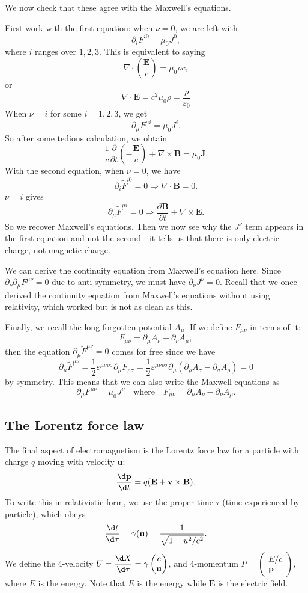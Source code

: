 \documentclass[a4paper]{article}
\begin{document}
We now check that these agree with the Maxwell's equations.

First work with the first equation: when $\nu = 0$, we are left with
\[
  \partial_i F^{i0} = \mu_0 J^0,
\]
where $i$ ranges over $1, 2, 3$. This is equivalent to saying
\[
  \nabla\cdot \left(\frac{\mathbf{E}}{c}\right) = \mu_0 \rho c,
\]
or
\[
  \nabla\cdot \mathbf{E} = c^2 \mu_0 \rho = \frac{\rho}{\varepsilon_0}
\]
When $\nu = i$ for some $i = 1, 2, 3$, we get
\[
  \partial _\mu F^{\mu i} = \mu_0 J^i.
\]
So after some tedious calculation, we obtain
\[
  \frac{1}{c}\frac{\partial}{\partial t}\left(-\frac{\mathbf{E}}{c}\right) + \nabla\times \mathbf{B} = \mu_0 \mathbf{J}.
\]
With the second equation, when $\nu = 0$, we have
\[
  \partial_i \tilde{F}^{i0} = 0 \Rightarrow  \nabla\cdot \mathbf{B} = 0.
\]
$\nu = i$ gives
\[
  \partial_\mu \tilde{F}^{\mu i} = 0 \Rightarrow  \frac{\partial \mathbf{B}}{\partial t} + \nabla\times \mathbf{E}.
\]
So we recover Maxwell's equations. Then we now see why the $J^\nu$ term appears in the first equation and not the second - it tells us that there is only electric charge, not magnetic charge.

We can derive the continuity equation from Maxwell's equation here. Since $\partial_\nu\partial_\mu F^{\mu\nu} = 0$ due to anti-symmetry, we must have $\partial_\nu J^\nu = 0$. Recall that we once derived the continuity equation from Maxwell's equations without using relativity, which worked but is not as clean as this.

Finally, we recall the long-forgotten potential $A_\mu$. If we define $F_{\mu\nu}$ in terms of it:
\[
  F_{\mu\nu} = \partial_\mu A_\nu - \partial_\nu A_\mu,
\]
then the equation $\partial_\mu \tilde{F}^{\mu\nu} = 0$ comes for free since we have
\[
  \partial_\mu \tilde{F}^{\mu\nu} = \frac{1}{2}\varepsilon^{\mu\nu\rho\sigma}\partial_{\mu}F_{\rho\sigma} = \frac{1}{2} \varepsilon^{\mu\nu\rho\sigma}\partial_\mu(\partial_\rho A_\sigma - \partial_\sigma A_\rho) = 0
\]
by symmetry. This means that we can also write the Maxwell equations as
\[
  \partial_\mu F^{\mu\nu} = \mu_0 J^\nu\quad\text{where}\quad F_{\mu\nu} = \partial_\mu A_\nu - \partial_\nu A_\mu.
\]
\subsection{The Lorentz force law}
The final aspect of electromagnetism is the Lorentz force law for a particle with charge $q$ moving with velocity $\mathbf{u}$:
\[
  \frac{\d \mathbf{p}}{\d t} = q(\mathbf{E} + \mathbf{v}\times \mathbf{B}).
\]
To write this in relativistic form, we use the proper time $\tau$ (time experienced by particle), which obeys
\[
  \frac{\d t}{\d \tau} = \gamma(\mathbf{u}) = \frac{1}{\sqrt{1 - u^2/c^2}}.
\]
We define the 4-velocity $\displaystyle U = \frac{\d X}{\d \tau} = \gamma\begin{pmatrix}c\\ \mathbf{u}\end{pmatrix}$, and 4-momentum $P = \begin{pmatrix}E/c\\ \mathbf{p}\end{pmatrix}$, where $E$ is the energy. Note that $E$ is the energy while $\mathbf{E}$ is the electric field.
\end{document}
